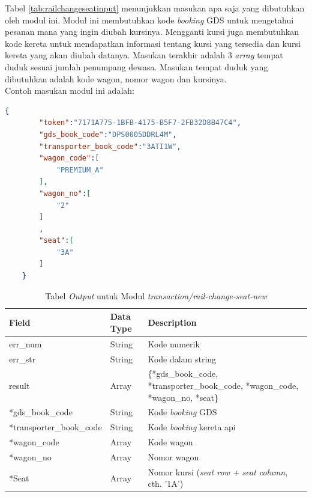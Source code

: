 Tabel \ref{tab:railchangeseatinput} menunjukkan masukan apa saja yang dibutuhkan oleh modul ini. Modul ini membutuhkan kode \textit{booking} GDS untuk mengetahui pesanan mana yang ingin diubah kursinya. Mengganti kursi juga membutuhkan kode kereta untuk mendapatkan informasi tentang kursi yang tersedia dan kursi kereta yang akan diubah datanya. Masukan terakhir adalah 3 \textit{array} tempat duduk sesuai jumlah penumpang dewasa. Masukan tempat duduk yang dibutuhkan adalah kode wagon, nomor wagon dan kursinya.\\

Contoh masukan modul ini adalah:

\begin{lstlisting}[language=json]
    {
        "token":"7171A775-1BFB-4175-B5F7-2FB32D8B47C4",
        "gds_book_code":"DPS0005DDRL4M",
        "transporter_book_code":"3ATI1W",
        "wagon_code":[
            "PREMIUM_A"
        ],
        "wagon_no":[
            "2"
        ]
        ,
        "seat":[
            "3A"
        ]
    }
\end{lstlisting}

\begin{table}[H]
	\centering 
	\caption{Tabel \textit{Output} untuk Modul \textit{transaction/rail-change-seat-new}}
	\label{tab:railchangeseatoutput}
	\begin{tabular}{|l|l|p{8cm}|}
		\hline
		Field & Data Type & Description\\
		\hline

		\hline
        err\_num & String & Kode numerik\\
        \hline
        err\_str & String & Kode dalam string\\
        \hline
        result & Array & \{*gds\_book\_code, *transporter\_book\_code, *wagon\_code, *wagon\_no, *seat\}\\
        \hline
        \hline
        *gds\_book\_code & String & Kode \textit{booking} GDS\\
        \hline
        *transporter\_book\_code & String & Kode \textit{booking} kereta api\\
        \hline
        *wagon\_code & Array & Kode wagon\\
        \hline
        *wagon\_no & Array & Nomor wagon\\
        \hline
        *Seat & Array & Nomor kursi (\textit{seat row + seat column}, cth. '1A')\\
        \hline
		
	\end{tabular} 
\end{table}

